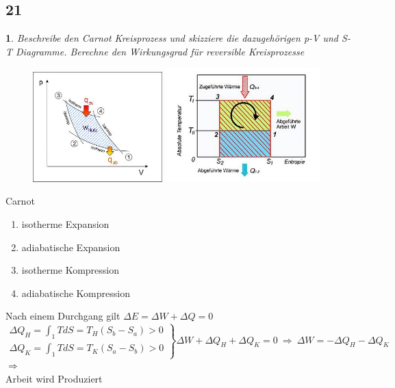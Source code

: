 \documentclass[12pt,a4paper]{report}
\newtheorem{myfrag}{}%
\begin{document}
\subsection{21}
\begin{myfrag}
Beschreibe den Carnot Kreisprozess und skizziere die dazugehörigen p-V und S-T
Diagramme. Berechne den Wirkungsgrad für reversible Kreisprozesse
\end{myfrag}
\begin{figure}[H]
\includegraphics[width=5cm]{Bilder/Frage21pV.jpg} 
\includegraphics[width=6cm]{Bilder/Frage21TS.jpg} 
\end{figure}
Carnot
\begin{enumerate}
\item isotherme Expansion
\item adiabatische Expansion
\item isotherme Kompression
\item adiabatische Kompression
\end{enumerate}
Nach einem Durchgang gilt $ \Delta E = \Delta W + \Delta Q = 0$
\\
$\left. \begin{array}{c} \Delta Q_H = \int_1 TdS = T_H(S_b-S_a) > 0 \\ \Delta Q_K = \int_1 TdS = T_K(S_a-S_b) > 0
\end{array} \right\rbrace \Delta W + \Delta Q_H + \Delta Q_K = 0 \ \Rightarrow \ \Delta W = - \Delta Q_H - \Delta Q_K$ \\
$\Rightarrow$ \\[2ex] Arbeit wird Produziert \\
\end{document}
